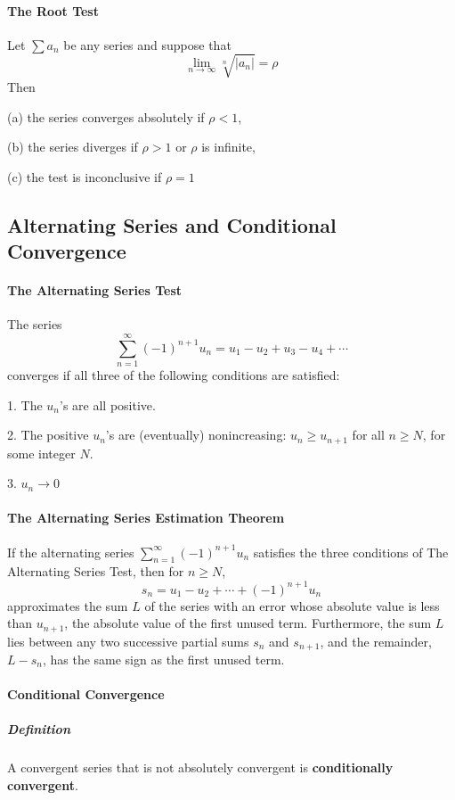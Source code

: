 \documentclass{article}
\begin{document}
            \paragraph{The Root Test}
            Let $\sum a_n$ be any series and suppose that 
            \[\lim\limits_{n\to\infty}\sqrt[n]{|a_n|}=\rho\]
            Then
            \par (a) the series converges absolutely if $\rho <1$,
            \par (b) the series diverges if $\rho >1$ or $\rho$ is infinite,
            \par (c) the test is inconclusive if $\rho =1$
        \subsection{Alternating Series and Conditional Convergence}
            \paragraph{The Alternating Series Test} The series
            \[\sum_{n=1}^\infty(-1)^{n+1}u_n=u_1-u_2+u_3-u_4+\cdots\]
            converges if all three of the following conditions are satisfied:
            \par 1. The $u_n$'s are all positive.
            \par 2. The positive $u_n$'s are (eventually) nonincreasing: $u_n\ge u_{n+1}$ for all $n\ge N$, for some integer $N$.
            \par 3. $u_n\to 0$
            \paragraph{The Alternating Series Estimation Theorem} If the alternating series $\sum_{n=1}^\infty (-1)^{n+1}u_n$ satisfies the three conditions of The Alternating Series Test, then for $n\ge N$,
            \[s_n=u_1-u_2+\cdots+(-1)^{n+1}u_n\]
            approximates the sum $L$ of the series with an error whose absolute value is less than $u_{n+1}$, the absolute value of the first unused term. Furthermore, the sum $L$ lies between any two successive partial sums $s_n$ and $s_{n+1}$, and the remainder, $L-s_n$, has the same sign as the first unused term.
            \paragraph{Conditional Convergence}
                \subparagraph{Definition} A convergent series that is not absolutely convergent is \textbf{conditionally convergent}.
\end{document}
